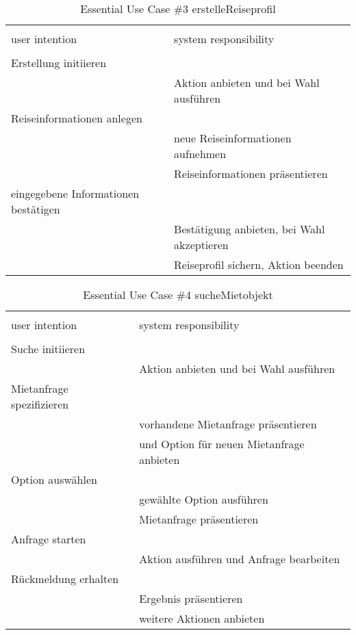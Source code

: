 \begin{table}[H]
\caption{Essential Use Case \#3 erstelleReiseprofil }
\centering
\begin{tabular}{l l}
\\ [-0.5ex]

\hline\hline
\\ [-0.5ex]
user intention & system responsibility
\\ [1.5ex]
\hline
\\ [-0.5ex]
Erstellung initiieren 		& 											 \\[1ex]
							& Aktion anbieten und bei Wahl ausführen	 \\[1ex]
Reiseinformationen anlegen 	& 											 \\[1ex] 
							& neue Reiseinformationen aufnehmen			 \\[1ex]
							& Reiseinformationen präsentieren			 \\[1ex]
eingegebene Informationen bestätigen	& 											 \\[1ex]
							& Bestätigung anbieten, bei Wahl akzeptieren \\[1ex]
							& Reiseprofil sichern, Aktion beenden 		 \\[1ex]

\hline
\end{tabular}
\label{tab:reiseprofil}
\end{table}

\begin{table}[H]
\caption{Essential Use Case \#4 sucheMietobjekt }
\centering
\begin{tabular}{l l}
\\ [-0.5ex]

\hline\hline
\\ [-0.5ex]
user intention & system responsibility
\\ [1.5ex]
\hline
\\ [-0.5ex]
Suche initiieren 			& 											 \\[1ex]
							& Aktion anbieten und bei Wahl ausführen	 \\[1ex]
Mietanfrage spezifizieren	& 											 \\[1ex]
							& vorhandene Mietanfrage präsentieren		 \\[1ex]
							& und Option für neuen Mietanfrage anbieten  \\[1ex]
Option auswählen     		& 											 \\[1ex] 
							& gewählte Option ausführen					 \\[1ex]
							& Mietanfrage präsentieren 					 \\[1ex]
Anfrage starten     		& 											 \\[1ex] 
							& Aktion ausführen und Anfrage bearbeiten	 \\[1ex]
Rückmeldung erhalten		& 											 \\[1ex]
							& Ergebnis präsentieren						 \\[1ex]
							& weitere Aktionen anbieten					 \\[1ex]


\hline
\end{tabular}
\label{tab:mietobjekt}
\end{table}


